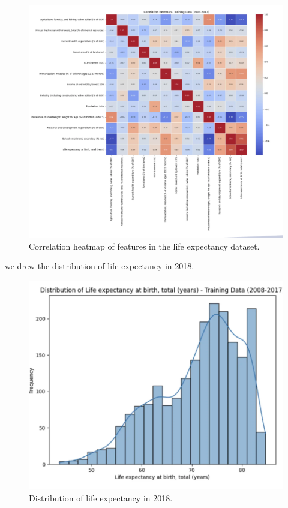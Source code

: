 \documentclass{article}
\begin{document}
\begin{figure}[h]
    \centering
    \includegraphics[width=0.8\columnwidth]{./pic/T1.a.2.png} %
    \caption{Correlation heatmap of features in the life expectancy dataset.}
    \label{fig:correlation_heatmap7}
\end{figure}

we drew the distribution of life expectancy in 2018.
\begin{figure}[h]
    \centering
    \includegraphics[width=0.8\columnwidth]{./pic/T1.a.3.png} %
    \caption{Distribution of life expectancy in 2018.}
    \label{fig:life_expectancy_distribution}
\end{figure}
\end{document}

